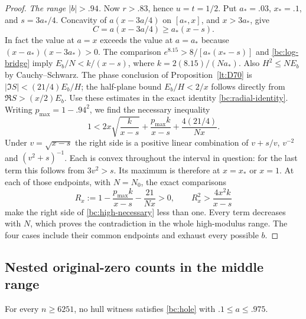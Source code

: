 \begin{proof}
\emph{The range $|b|>.94$.}
Now $r>.83$, hence $u=t=1/2$.
Put $a_*=.03$, $x_* =.1$, and $s=3a_*/4$.
Concavity of $a(x-3a/4)$ on $[a_*,x]$, and $x>3a_*$, give
\[
 C=a(x-3a/4)\geq a_*(x-s).
\]
In fact the value at $a=x$ exceeds the value at $a=a_*$ because
$(x-a_*)(x-3a_*)>0$.
The comparison $e^{8.15}>8/[a_*(x_*-s)]$ and
\eqref{bc:log-bridge} imply
$E_b/N<k/(x-s)$, where $k=2(8.15)/(Na_*)$.
Also $H^2\leq NE_b$ by Cauchy--Schwarz.
The phase conclusion of Proposition~\ref{lt:D70} is
$|\Im S|<(21/4)E_b/H$; the half-plane bound
$E_b/H<2/x$ follows directly from $\Re S>(x/2)E_b$.
Use these estimates in the exact identity \eqref{bc:radial-identity}.
Writing $p_{\max}=1-.94^2$, we find the necessary inequality
\begin{equation}\label{bc:high-necessary}
 1<2x\sqrt{\frac{k}{x-s}}
       +\frac{p_{\max}k}{x-s}
       +\frac{4(21/4)}{Nx}.
\end{equation}
Under $v=\sqrt{x-s}$ the right side is a positive linear combination
of $v+s/v$, $v^{-2}$ and $(v^2+s)^{-1}$.
Each is convex throughout the interval in question: for the last
term this follows from $3v^2>s$.
Its maximum is therefore at $x=x_*$ or $x=1$.
At each of those endpoints, with $N=N_0$, the exact comparisons
\[
 R_x:=1-\frac{p_{\max}k}{x-s}-\frac{21}{Nx}>0,\qquad
 R_x^2>\frac{4x^2k}{x-s}
\]
make the right side of \eqref{bc:high-necessary} less than one.
Every term decreases with $N$, which proves the contradiction in
the whole high-modulus range.  The four cases include their common
endpoints and exhaust every possible $b$.
\end{proof}

\subsection{Nested original-zero counts in the middle range}

\begin{proposition}\label{bc:compact}
For every $n\geq6251$, no hull witness satisfies
\eqref{bc:hole} with $.1\leq a\leq.975$.
\end{proposition}

